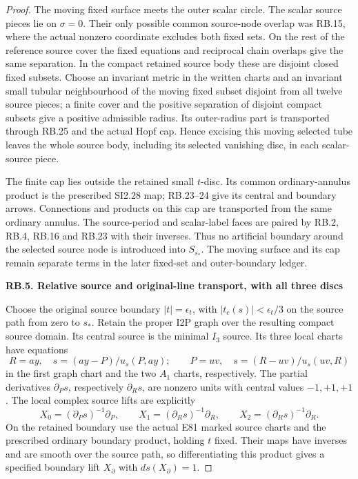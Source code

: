 \begin{proof}
The moving fixed surface meets the outer scalar circle. The scalar
source pieces lie on \(\sigma=0\). Their only possible common
source-node overlap was RB.15, where the actual nonzero coordinate
excludes both fixed sets. On the rest of the reference source cover
the fixed equations and reciprocal chain overlaps give the same
separation. In the compact retained source body these are disjoint
closed fixed subsets. Choose an invariant metric in the written
charts and an invariant small tubular neighbourhood of the moving
fixed subset disjoint from all twelve source pieces; a finite cover
and the positive separation of disjoint compact subsets give a
positive admissible radius. Its outer-radius part is transported
through RB.25 and the actual Hopf cap. Hence excising this moving
selected tube leaves the whole source body, including its selected
vanishing disc, in each scalar-source piece.

The finite cap lies outside the retained small \(t\)-disc. Its
common ordinary-annulus product is the prescribed SI2.28 map;
RB.23--24 give its central and boundary arrows. Connections and
products on this cap are transported from the same ordinary annulus.
The source-period and scalar-label faces are paired by RB.2, RB.4,
RB.16 and RB.23 with their inverses. Thus no artificial boundary
around the selected source node is introduced into \(S_{s_*}\).
The moving surface and its cap remain separate terms in the later
fixed-set and outer-boundary ledger.

\par

\medskip\noindent\textbf{RB.5. Relative source and original-line transport, with all three discs}

\par\nobreak

Choose the original source boundary \(|t|=\epsilon_t\), with
\(|t_c(s)|<\epsilon_t/3\) on the source path from zero to \(s_*\).
Retain the proper I2P graph over the resulting compact source domain.
Its central source is the minimal \(I_3\) source. Its three local
charts have equations
\[
 R=ay,\quad s=(ay-P)/u_s(P,ay);
 \qquad P=uv,\quad s=(R-uv)/u_s(uv,R)
 \tag{RB.26}
\]
in the first graph chart and the two \(A_{1}\) charts, respectively.
The partial derivatives \(\partial_Ps\), respectively
\(\partial_Rs\), are nonzero units with central values
\(-1,+1,+1\). The local complex source lifts are explicitly
\[
 X_0=(\partial_Ps)^{-1}\partial_P,
 \qquad X_1=(\partial_Rs)^{-1}\partial_R,
 \qquad X_2=(\partial_Rs)^{-1}\partial_R.
 \tag{RB.27}
\]
On the retained boundary use the actual E81 marked source charts
and the prescribed ordinary boundary product, holding \(t\)
fixed. Their maps have inverses and are smooth over the source
path, so differentiating this product gives a specified boundary
lift \(X_\partial\) with \(ds(X_\partial)=1\).


\end{proof}
